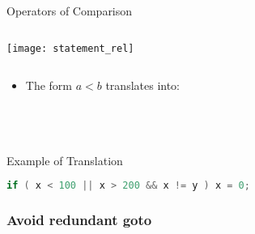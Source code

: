 \begin{bibunit}[apalike]
\begin{frame}{Operators of Comparison}
	\begin{columns}
		\begin{column}{.3\linewidth}
			\begin{center}
			\texttt{[image: statement\_rel]}
			\end{center}
		\end{column}
		\begin{column}{.7\linewidth}
			\begin{footnotesize}
			\begin{sdd}
			\end{sdd}
			\end{footnotesize}
		\end{column}
	\end{columns}
	\vfill
	\begin{itemize}
	\item The form $a<b$ translates into: \\
		 \\
		 \\
		 \\
	\end{itemize}
\end{frame}

\begin{frame}[fragile]{Example of Translation}
	\begin{lstlisting}[language=Java]
		if ( x < 100 || x > 200 && x != y ) x = 0;
	\end{lstlisting}
	\vfill
	\begin{tac}
	\tacdots[L1]
	\end{tac}
\end{frame}

\subsubsection{Avoid redundant goto}


\end{bibunit}
